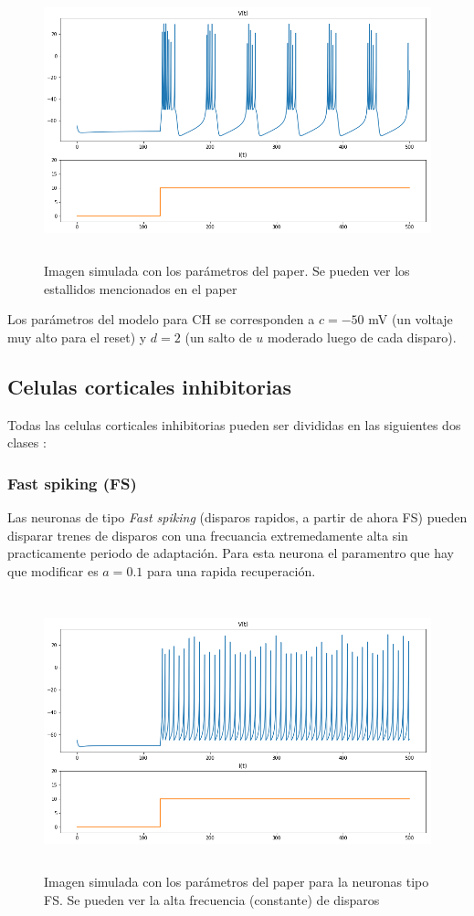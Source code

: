 \documentclass[12pt]{article}
\begin{document}
 \begin{figure}[h!]
    \centering
        \includegraphics[height=8cm]{images/CH.png}
    \caption[fontsize=2pt]{Imagen simulada con los parámetros del paper. Se pueden ver los estallidos mencionados en el paper}
\end{figure}

Los parámetros del modelo para CH se corresponden a $c = -50$ mV (un voltaje muy alto para el reset) y $d = 2$ (un salto de $u$ moderado luego de cada disparo).

\subsection{Celulas corticales inhibitorias}
Todas las celulas corticales inhibitorias pueden ser divididas en las siguientes dos clases \cite{inhibitorias}:

\subsubsection{Fast spiking (FS)}
Las neuronas de tipo \textit{Fast spiking} (disparos rapidos, a partir de ahora FS) pueden disparar trenes de disparos con una frecuancia extremedamente alta sin practicamente periodo de adaptación.
Para esta neurona el paramentro que hay que modificar es $a = 0.1$ para una rapida recuperación.

\begin{figure}[h!]
    \centering
        \includegraphics[height=8cm]{images/FS.png}
    \caption[fontsize=2pt]{Imagen simulada con los parámetros del paper para la neuronas tipo FS. Se pueden ver la alta frecuencia (constante) de disparos}
\end{figure}
\end{document}
